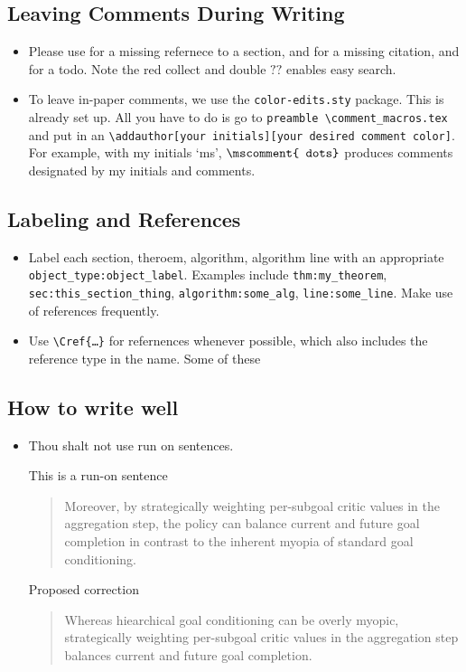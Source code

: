 
\subsection{Leaving Comments During Writing}
\begin{itemize}
    \item Please use \REF for a missing refernece to a section, and \CITE for a missing citation, and \TODO for a todo. Note the red collect and double $??$ enables easy search. 
    \item To leave in-paper comments, we use the \texttt{color-edits.sty} package. This is already set up. All you have to do is go to \texttt{preamble \textbackslash comment\_macros.tex} and put in an \texttt{\textbackslash addauthor{[your initials]}{[your desired comment color]}}. For example, with my initials `ms', $\texttt{\textbackslash mscomment\{\
    dots\}}$ produces comments designated by my initials and comments.
\end{itemize}
\subsection{ Labeling and References}
\begin{itemize}
    \item Label each section, theroem, algorithm, algorithm line with an appropriate \texttt{object\_type:object\_label}. Examples include \texttt{thm:my\_theorem}, \texttt{sec:this\_section\_thing}, \texttt{algorithm:some\_alg}, \texttt{line:some\_line}. Make use of references frequently. 
    \item Use \texttt{\textbackslash Cref\{\dots\}} for refernences whenever possible, which also includes the reference type in the name. Some of these 
\end{itemize}
\subsection{How to write well}
\begin{itemize}
    \item Thou shalt not use run on sentences.
    \begin{example} This is a run-on sentence
    \begin{quote}
                Moreover, by strategically weighting per-subgoal critic values in the aggregation step, the policy can balance current and future goal completion {\color{red} in contrast to the inherent myopia of standard goal conditioning. } 

    \end{quote}
        Proposed correction

    \begin{quote}
    Whereas hiearchical goal conditioning can be overly myopic, strategically weighting per-subgoal critic values in the aggregation step balances current and future goal completion. 
    \end{quote}

    \end{example}
\end{itemize}

